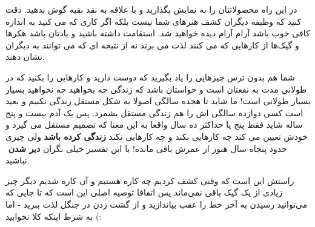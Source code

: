 در این راه محصولاتتان را به نمایش بگذارید و با علاقه به نقد بقیه گوش بدهید. دقت کنید که وظیفه دیگران کشف هنرهای شما نیست بلکه اگر کاری که می کنید به اندازه کافی خوب باشد آرام آرام دیده خواهید شد. استقامت داشته باشید و یادتان باشد هکرها و گیک‌ها از کارهایی که می کنند لذت می برند نه از نتیجه ای که می توانند به دیگران نشان دهند.

شما هم بدون ترس چیزهایی را یاد بگیرید که دوست دارید و کارهایی را بکنید که در طولانی مدت به نفعتان است و حواستان باشد که زندگی چه بخواهید چه نخواهید بسیار بسیار طولانی است! ما شاید تا هجده سالگی اصولا به شکل مستقل زندگی نکنیم و بعید است کسی دوازده سالگی اش را هم زندگی مستقل بشمرد. پس یک آدم بیست و پنج ساله شاید فقط پنج یا حداکثر ده سال واقعا به این معنا که تصمیم مستقل می گیرد و خودش تعیین می کند چه کارهایی بکند و چه کارهایی نکند
\textbf{زندگی کرده باشد}
ولی چیزی حدود پنجاه سال هنوز از عمرش باقی مانده! با این تفسیر خیلی نگران
\textbf{دیر شدن}
‌ نباشید. 

راستش این است که وقتی کشف کردیم چه کاره هستیم و آن کاره شدیم دیگر چیز زیادی از یک گیک باقی نمی‌ماند پس اتفاقا توصیه اصلی این است که تا جایی که می‌توانید رسیدن به آخر خط را عقب بیاندازید و از گشت زدن در جنگل لذت ببرید - اما به شرط اینکه کلا نخوابید (:
